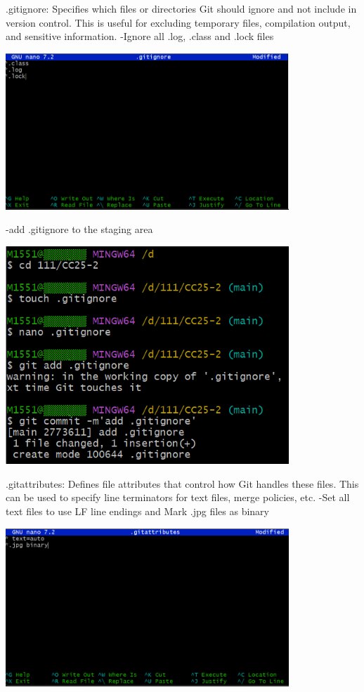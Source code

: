 \documentclass[a4paper, 11pt]{report}
\begin{document}
\noindent .gitignore: Specifies which files or directories Git should ignore and not include in version control. This is useful for excluding temporary files, compilation output, and sensitive information.
-Ignore all .log, .class and .lock files
\begin{center}
	\includegraphics[width=0.8\textwidth, keepaspectratio]{nanoignore.png}
\end{center}
-add .gitignore to the staging area
\begin{center}
	\includegraphics[width=0.8\textwidth, keepaspectratio]{ignore.png}
\end{center} 
\noindent .gitattributes: Defines file attributes that control how Git handles these files. This can be used to specify line terminators for text files, merge policies, etc. 
-Set all text files to use LF line endings and Mark .jpg files as binary
\begin{center}
	\includegraphics[width=0.8\textwidth, keepaspectratio]{nanoattributes.png}
\end{center}
\end{document}
